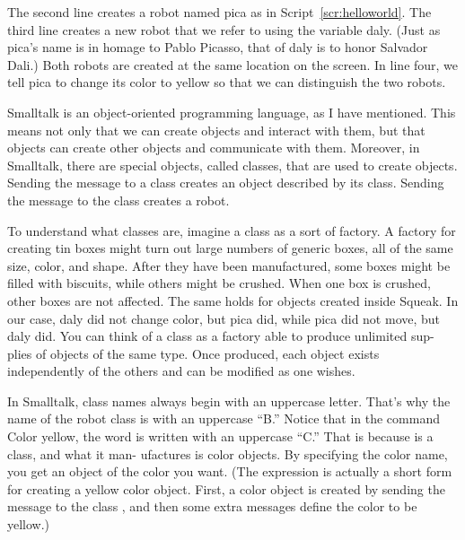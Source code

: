 \documentclass[a4paper,10pt,twoside]{book}
\begin{document}
The second line creates a robot named pica as in Script~\ref{scr:helloworld}. The third line creates a new robot that we refer to using the variable daly. (Just as pica’s name is in homage to Pablo Picasso, that of daly is to honor Salvador Dali.) Both robots are created at the same location on the screen. In line four, we tell pica to change its color to yellow so that we can distinguish the two robots. 

Smalltalk is an object-oriented programming language, as I have mentioned. This means 
not only that we can create objects and interact with them, but that objects can create other 
objects and communicate with them. Moreover, in Smalltalk, there are special objects, called 
classes, that are used to create objects. Sending the message  to a class creates an object 
described by its class. Sending the message  to the  class creates a robot. 

To understand what classes are, imagine a class as a sort of factory. A factory for creating 
tin boxes might turn out large numbers of generic boxes, all of the same size, color, and shape. 
After they have been manufactured, some boxes might be filled with biscuits, while others 
might be crushed. When one box is crushed, other boxes are not affected. The same holds for 
objects created inside Squeak. In our case, daly did not change color, but pica did, while pica 
did not move, but daly did. You can think of a class as a factory able to produce unlimited sup- 
plies of objects of the same type. Once produced, each object exists independently of the 
others and can be modified as one wishes. 


In Smalltalk, class names always begin with an uppercase letter. That’s why the name of 
the robot class is  with an uppercase “B.” Notice that in the command Color yellow, the 
word  is written with an uppercase “C.” That is because  is a class, and what it man- 
ufactures is color objects. By specifying the color name, you get an object of the color you 
want. (The expression  is actually a short form for creating a yellow color object. 
First, a color object is created by sending the message  to the class , and then some 
extra messages define the color to be yellow.) 


\end{document}
